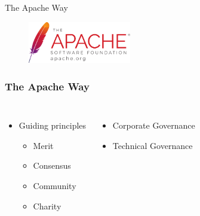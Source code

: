 \documentclass[aspectratio=169,11pt,hyperref={colorlinks=true}]{beamer}
\begin{document}
\begin{frame}[c]
  \begin{center}
      \color{white}
      \Huge The Apache Way
      \begin{figure}
        \includegraphics[width=0.4\textwidth]{pictures/asf_logo_url.pdf}
      \end{figure}
  \end{center}
\end{frame}


\begin{frame}
  \frametitle{The Apache Way}
  \begin{columns}
    \begin{itemize}
      \item{Guiding principles}
      \begin{itemize}
          \item{Merit}
          \item{Consensus}
          \item{Community}
          \item{Charity}
      \end{itemize}
    \end{itemize}
    \begin{itemize}
        \item{Corporate Governance}
        \item{Technical Governance}
    \end{itemize}
  \end{columns}
\end{frame}
\end{document}
